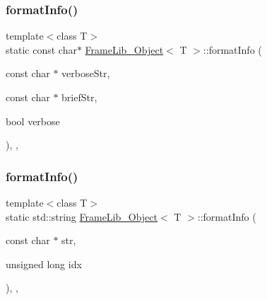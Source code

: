 \subsubsection{\texorpdfstring{format\+Info()}{formatInfo()}\hspace{0.1cm}{\footnotesize\ttfamily [1/5]}}
{\footnotesize\ttfamily template$<$class T$>$ \\
static const char$\ast$ \hyperlink{class_frame_lib___object}{Frame\+Lib\+\_\+\+Object}$<$ T $>$\+::format\+Info (\begin{DoxyParamCaption}\item[{const char $\ast$}]{verbose\+Str,  }\item[{const char $\ast$}]{brief\+Str,  }\item[{bool}]{verbose }\end{DoxyParamCaption})\hspace{0.3cm}{\ttfamily [inline]}, {\ttfamily [static]}, {\ttfamily [protected]}}

\mbox{\label{class_frame_lib___object_ab11cf702a6158f0cd9952ceaaf6c4952}} 
\subsubsection{\texorpdfstring{format\+Info()}{formatInfo()}\hspace{0.1cm}{\footnotesize\ttfamily [2/5]}}
{\footnotesize\ttfamily template$<$class T$>$ \\
static std\+::string \hyperlink{class_frame_lib___object}{Frame\+Lib\+\_\+\+Object}$<$ T $>$\+::format\+Info (\begin{DoxyParamCaption}\item[{const char $\ast$}]{str,  }\item[{unsigned long}]{idx }\end{DoxyParamCaption})\hspace{0.3cm}{\ttfamily [inline]}, {\ttfamily [static]}, {\ttfamily [protected]}}

\mbox{\label{class_frame_lib___object_aa30676408b8f8161894eb0e533a8522b}} 
